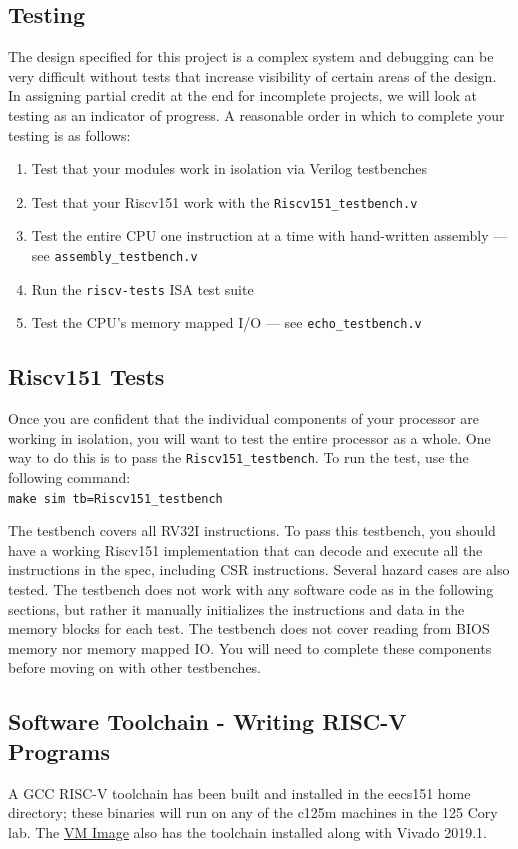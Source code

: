 \documentclass[11pt]{article}
\begin{document}
\subsection{Testing}
\label{testing}
The design specified for this project is a complex system and debugging can be very difficult without tests that increase visibility of certain areas of the design.
In assigning partial credit at the end for incomplete projects, we will look at testing as an indicator of progress.
A reasonable order in which to complete your testing is as follows:

\begin{enumerate}
  \item Test that your modules work in isolation via Verilog testbenches
  \item Test that your Riscv151 work with the \verb|Riscv151_testbench.v|
  \item Test the entire CPU one instruction at a time with hand-written assembly --- see \verb|assembly_testbench.v|
  \item Run the \verb|riscv-tests| ISA test suite
  \item Test the CPU's memory mapped I/O --- see \verb|echo_testbench.v|
\end{enumerate}

\subsection{Riscv151 Tests}

Once you are confident that the individual components of your processor are working in isolation, you will want to test the entire processor as a whole. One way to do this is to pass the \verb|Riscv151_testbench|. To run the test, use the following command:\\
\verb|make sim tb=Riscv151_testbench|

The testbench covers all RV32I instructions. To pass this testbench, you should have a working Riscv151 implementation that can decode and execute all the instructions in the spec, including CSR instructions. Several hazard cases are also tested. The testbench does not work with any software code as in the following sections, but rather it manually initializes the instructions and data in the memory blocks for each test. The testbench does not cover reading from BIOS memory nor memory mapped IO. You will need to complete these components before moving on with other testbenches.

\subsection{Software Toolchain - Writing RISC-V Programs}
\label{toolchain}
A GCC RISC-V toolchain has been built and installed in the eecs151 home directory; these binaries will run on any of the c125m machines in the 125 Cory lab. The \href{https://berkeley.box.com/s/s4z0ykpf0tudrm9hce8fsmitpgb2khhe}{VM Image} also has the toolchain installed along with Vivado 2019.1.
\end{document}
